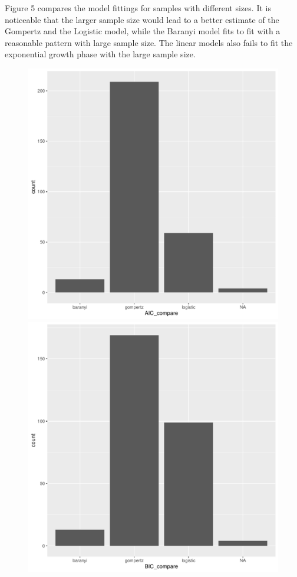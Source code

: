 \documentclass[11pt, oneside]{article}
\begin{document}
		\noindent Figure 5 compares the model fittings for samples with different sizes. It is noticeable that the larger sample size would lead to a better estimate of the Gompertz and the Logistic model, while the Baranyi model fits to fit with a reasonable pattern with large sample size. The linear models also fails to fit the exponential growth phase with the large sample size.
		
		\begin{figure}[H]
			\begin{center}
			\begin{minipage}{.5\textwidth}
				\centering
				\includegraphics[scale = 0.5]{AIC_plot.pdf}
			\end{minipage}%
			\begin{minipage}{.5\textwidth}
				\centering
				\includegraphics[scale = 0.5]{BIC_plot.pdf}

\end{minipage}
\end{center}
\end{figure}
\end{document}
